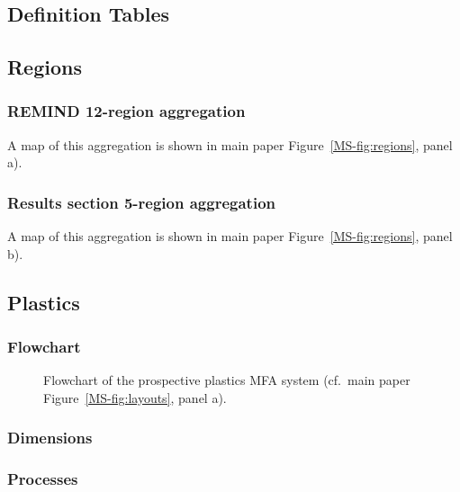
\begin{landscape}

\section{Definition Tables} \label{sec:definitions}
\subsection{Regions}

\subsubsection{REMIND 12-region aggregation}
A map of this aggregation is shown in main paper Figure~\ref{MS-fig:regions}, panel a).

\subsubsection{Results section 5-region aggregation}
A map of this aggregation is shown in main paper Figure~\ref{MS-fig:regions}, panel b).
\end{landscape}

\clearpage
\subsection{Plastics}

\subsubsection{Flowchart}
\begin{figure}[htbp]
    \centering
    \caption{Flowchart of the prospective plastics MFA system (cf.\ main paper Figure~\ref{MS-fig:layouts}, panel a).}
    \label{fig:flowachart_plastics}
\end{figure}

\clearpage

\subsubsection{Dimensions}

\subsubsection{Processes}


